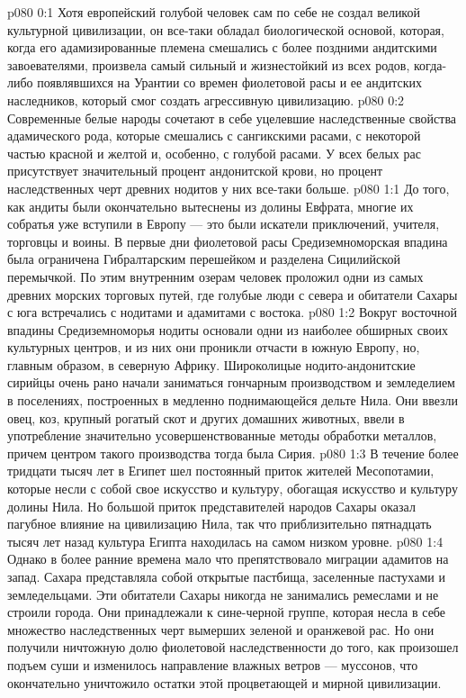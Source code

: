 \author{Архангел}
\vs p080 0:1 Хотя европейский голубой человек сам по себе не создал великой культурной цивилизации, он все\hyp{}таки обладал биологической основой, которая, когда его адамизированные племена смешались с более поздними андитскими завоевателями, произвела самый сильный и жизнестойкий из всех родов, когда\hyp{}либо появлявшихся на Урантии со времен фиолетовой расы и ее андитских наследников, который смог создать агрессивную цивилизацию.
\vs p080 0:2 Современные белые народы сочетают в себе уцелевшие наследственные свойства адамического рода, которые смешались с сангикскими расами, с некоторой частью красной и желтой и, особенно, с голубой расами. У всех белых рас присутствует значительный процент андонитской крови, но процент наследственных черт древних нодитов у них все\hyp{}таки больше.
\vs p080 1:1 До того, как андиты были окончательно вытеснены из долины Евфрата, многие их собратья уже вступили в Европу --- это были искатели приключений, учителя, торговцы и воины. В первые дни фиолетовой расы Средиземноморская впадина была ограничена Гибралтарским перешейком и разделена Сицилийской перемычкой. По этим внутренним озерам человек проложил одни из самых древних морских торговых путей, где голубые люди с севера и обитатели Сахары с юга встречались с нодитами и адамитами с востока.
\vs p080 1:2 Вокруг восточной впадины Средиземноморья нодиты основали одни из наиболее обширных своих культурных центров, и из них они проникли отчасти в южную Европу, но, главным образом, в северную Африку. Широколицые нодито\hyp{}андонитские сирийцы очень рано начали заниматься гончарным производством и земледелием в поселениях, построенных в медленно поднимающейся дельте Нила. Они ввезли овец, коз, крупный рогатый скот и других домашних животных, ввели в употребление значительно усовершенствованные методы обработки металлов, причем центром такого производства тогда была Сирия.
\vs p080 1:3 В течение более тридцати тысяч лет в Египет шел постоянный приток жителей Месопотамии, которые несли с собой свое искусство и культуру, обогащая искусство и культуру долины Нила. Но большой приток представителей народов Сахары оказал пагубное влияние на цивилизацию Нила, так что приблизительно пятнадцать тысяч лет назад культура Египта находилась на самом низком уровне.
\vs p080 1:4 Однако в более ранние времена мало что препятствовало миграции адамитов на запад. Сахара представляла собой открытые пастбища, заселенные пастухами и земледельцами. Эти обитатели Сахары никогда не занимались ремеслами и не строили города. Они принадлежали к сине\hyp{}черной группе, которая несла в себе множество наследственных черт вымерших зеленой и оранжевой рас. Но они получили ничтожную долю фиолетовой наследственности до того, как произошел подъем суши и изменилось направление влажных ветров --- муссонов, что окончательно уничтожило остатки этой процветающей и мирной цивилизации.
